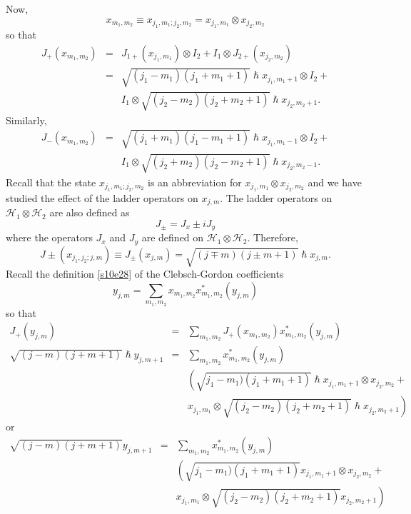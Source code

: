 \documentclass{article}
\numberwithin{equation}{section}
\theoremstyle{plain}
\numberwithin{thm}{section}
\theoremstyle{plain}
\numberwithin{prop}{section}
\theoremstyle{definition}
\numberwithin{defn}{section}
\theoremstyle{remark}
\begin{document}
Now,
\begin{equation}\label{s11e10}
x_{m_1,m_2} \equiv x_{j_1,m_1;j_2,m_2} = x_{j_1,m_1} \otimes x_{j_2,m_2}
\end{equation}
so that
\begin{eqnarray}
J_+(x_{m_1,m_2}) &=&
 J_{1+}(x_{j_1,m_1}) \otimes I_2 + I_1 \otimes J_{2+}(x_{j_2,m_2}) \nonumber \\
 &=& \sqrt{(j_1-m_1)(j_1+m_1+1)}\hslash x_{j_1,m_1+1} \otimes I_2 + \nonumber \\
 & &I_1 \otimes \sqrt{(j_2-m_2)(j_2+m_2+1)}\hslash x_{j_2,m_2+1}.\label{s11e11}
\end{eqnarray}
Similarly,
\begin{eqnarray}
J_-(x_{m_1,m_2})
 &=& \sqrt{(j_1+m_1)(j_1-m_1+1)}\hslash x_{j_1,m_1-1} \otimes I_2 + \nonumber \\
 & &I_1 \otimes \sqrt{(j_2+m_2)(j_2-m_2+1)}\hslash x_{j_2,m_2-1}.\label{s11e12}
\end{eqnarray}
Recall that the state $x_{j_1,m_1;j_2,m_2}$ is an abbreviation for $x_{j_1,m_1}
\otimes x_{j_2,m_2}$ and we have studied the effect of the ladder operators on
$x_{j,m}$. The ladder operators on $\mathcal{H}_1 \otimes \mathcal{H}_2$ are
also defined as
\begin{equation}\label{s11e13}
J_{\pm} = J_x \pm iJ_y
\end{equation}
where the operators $J_x$ and $J_y$ are defined on $\mathcal{H}_1 \otimes 
\mathcal{H}_2$. Therefore,
\begin{equation}\label{s11e14}
J\pm(x_{j_1,j_2;j,m}) \equiv J_\pm(x_{j,m}) = 
\sqrt{(j \mp m)(j \pm m + 1)}\hslash x_{j,m}.
\end{equation}
Recall the definition \eqref{s10e28} of the Clebsch-Gordon coefficients
\[
y_{j,m} = \sum_{m_1, m_2}x_{m_1,m_2}x_{m_1,m_2}^\ast (y_{j,m})
\]
so that
\begin{eqnarray*}
J_+(y_{j,m}) &=& \sum_{m_1,m_2}J_+(x_{m_1,m_2})x_{m_1,m_2}^\ast (y_{j,m})
\\
\sqrt{(j-m)(j+m+1)}\hslash y_{j,m+1}&=&\sum_{m_1,m_2}x_{m_1,m_2}^\ast (y_{j,m})
\\
 & &\left(\sqrt{j_1-m_1)(j_1+m_1+1)}\hslash x_{j_1,m_1+1} \otimes x_{j_2,m_2} 
+ \right.  \\
 & & \left. x_{j_1,m_1} \otimes \sqrt{(j_2-m_2)(j_2+m_2+1)}\hslash x_{j_2,m_2+1}\right)
\end{eqnarray*}
or
\begin{eqnarray}
\sqrt{(j-m)(j+m+1)}y_{j,m+1} &=& \sum_{m_1,m_2}x_{m_1,m_2}^\ast (y_{j,m}) 
\nonumber \\
 & & \left(\sqrt{j_1-m_1)(j_1+m_1+1)}x_{j_1,m_1+1} \otimes x_{j_2,m_2} + 
\right. \nonumber \\
 & & \left. x_{j_1,m_1} \otimes \sqrt{(j_2-m_2)(j_2+m_2+1)}x_{j_2,m_2+1}\right)
\nonumber \\
 & & \label{s11e15}
\end{eqnarray}
\end{document}
